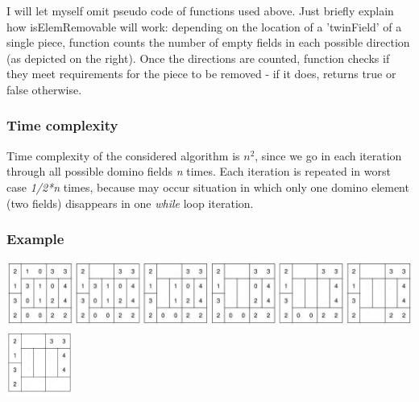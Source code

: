 I will let myself omit pseudo code of functions used above. Just briefly explain how isElemRemovable
will work: depending on the location of a 'twinField' of a single piece, function counts the number
of empty fields in each possible direction (as depicted on the right). Once the directions are
counted, function checks if they meet requirements for the piece to be removed - if it does, returns
true or false otherwise.

\subsubsection{Time complexity}
Time complexity of the considered algorithm is \textit{$n^2$}, since we go in each iteration 
through all possible domino fields \textit{n} times. Each iteration is repeated in worst case
\textit{1/2*n} times, because may occur situation in which only one domino element (two fields)
disappears in one \textit{while} loop iteration.

\subsubsection{Example}

\includegraphics[width=1\textwidth]{board1.jpg} \\
\includegraphics[width=0.163\textwidth]{board2.jpg}
